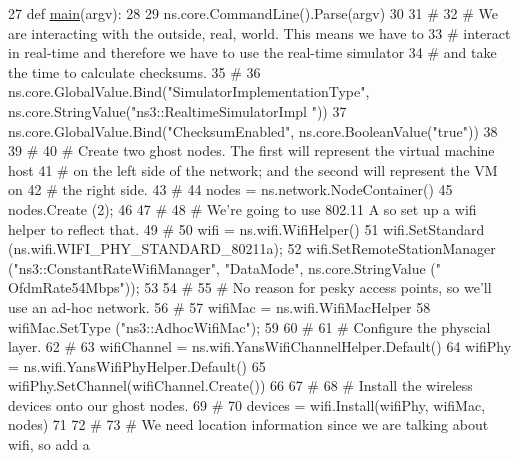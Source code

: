 \begin{DoxyCode}
27 \textcolor{keyword}{def }\hyperlink{namespacetap-wifi-virtual-machine_ab59779626af8925d05c112e49231cab9}{main}(argv):
28 
29     ns.core.CommandLine().Parse(argv)
30     
31     \textcolor{comment}{#}
32     \textcolor{comment}{# We are interacting with the outside, real, world.  This means we have to }
33     \textcolor{comment}{# interact in real-time and therefore we have to use the real-time simulator}
34     \textcolor{comment}{# and take the time to calculate checksums.}
35     \textcolor{comment}{#}
36     ns.core.GlobalValue.Bind(\textcolor{stringliteral}{"SimulatorImplementationType"}, ns.core.StringValue(\textcolor{stringliteral}{"ns3::RealtimeSimulatorImpl
      "}))
37     ns.core.GlobalValue.Bind(\textcolor{stringliteral}{"ChecksumEnabled"}, ns.core.BooleanValue(\textcolor{stringliteral}{"true"}))
38 
39     \textcolor{comment}{#}
40     \textcolor{comment}{# Create two ghost nodes.  The first will represent the virtual machine host}
41     \textcolor{comment}{# on the left side of the network; and the second will represent the VM on }
42     \textcolor{comment}{# the right side.}
43     \textcolor{comment}{#}
44     nodes = ns.network.NodeContainer()
45     nodes.Create (2);
46 
47     \textcolor{comment}{#}
48     \textcolor{comment}{# We're going to use 802.11 A so set up a wifi helper to reflect that.}
49     \textcolor{comment}{#}
50     wifi = ns.wifi.WifiHelper()
51     wifi.SetStandard (ns.wifi.WIFI\_PHY\_STANDARD\_80211a);
52     wifi.SetRemoteStationManager (\textcolor{stringliteral}{"ns3::ConstantRateWifiManager"}, \textcolor{stringliteral}{"DataMode"}, ns.core.StringValue (\textcolor{stringliteral}{"
      OfdmRate54Mbps"}));
53 
54     \textcolor{comment}{#}
55     \textcolor{comment}{# No reason for pesky access points, so we'll use an ad-hoc network.}
56     \textcolor{comment}{#}
57     wifiMac = ns.wifi.WifiMacHelper
58     wifiMac.SetType (\textcolor{stringliteral}{"ns3::AdhocWifiMac"});
59 
60     \textcolor{comment}{#}
61     \textcolor{comment}{# Configure the physcial layer.}
62     \textcolor{comment}{#}
63     wifiChannel = ns.wifi.YansWifiChannelHelper.Default()
64     wifiPhy = ns.wifi.YansWifiPhyHelper.Default()
65     wifiPhy.SetChannel(wifiChannel.Create())
66 
67     \textcolor{comment}{#}
68     \textcolor{comment}{# Install the wireless devices onto our ghost nodes.}
69     \textcolor{comment}{#}
70     devices = wifi.Install(wifiPhy, wifiMac, nodes)
71 
72     \textcolor{comment}{#}
73     \textcolor{comment}{# We need location information since we are talking about wifi, so add a}

\end{DoxyCode}

